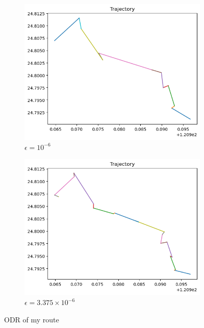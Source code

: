 \documentclass[12pt, a4paper]{article}
\begin{document}
\begin{figure}[htbp]
\centering
\begin{subfigure}{.475\linewidth}
\includegraphics[width=\linewidth]{q5}
\caption{$\epsilon=10^{-6}$}
\end{subfigure}
\begin{subfigure}{.475\linewidth}
\includegraphics[width=\linewidth]{q5_p}
\caption{$\epsilon=3.375\times10^{-6}$}
\end{subfigure}
\caption{ODR of my route}
\end{figure}
\end{document}
